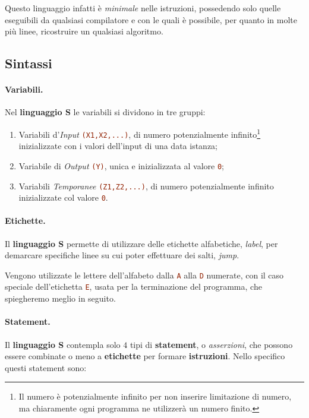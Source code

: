 Questo linguaggio infatti è \textit{minimale} nelle istruzioni, possedendo solo quelle eseguibili da qualsiasi compilatore e con le quali è possibile, per quanto in molte più linee, ricostruire un qualsiasi algoritmo.

\subsection{Sintassi}

\paragraph*{Variabili.} Nel \textbf{linguaggio S} le variabili si dividono in tre gruppi:

\begin{enumerate}
  \item Variabili d'\textit{Input} \lstinline[language=ini]{(X1,X2,...)}, di numero potenzialmente infinito\footnote{Il numero è potenzialmente infinito per non inserire limitazione di numero, ma chiaramente ogni programma ne utilizzerà un numero finito.} inizializzate con i valori dell'input di una data istanza;
  \item Variabile di \textit{Output} \lstinline[language=ini]{(Y)}, unica e inizializzata al valore \lstinline[language=ini]{0};
  \item Variabili \textit{Temporanee} \lstinline[language=ini]{(Z1,Z2,...)}, di numero potenzialmente infinito inizializzate col valore \lstinline[language=ini]{0}.
\end{enumerate}

\paragraph*{Etichette.} Il \textbf{linguaggio S} permette di utilizzare delle
etichette alfabetiche, \textit{label}, per demarcare specifiche linee su cui
poter effettuare dei salti, \textit{jump}.


Vengono utilizzate le lettere dell'alfabeto dalla \lstinline[language=ini]{A} alla \lstinline[language=ini]{D} numerate, con il caso
speciale dell'etichetta \lstinline[language=ini]{E}, usata per la terminazione del programma, che spiegheremo meglio in seguito.

\paragraph*{Statement.} Il \textbf{linguaggio S} contempla solo \(4\) tipi di \textbf{statement}, o \textit{asserzioni}, che possono essere combinate o meno a \textbf{etichette} per formare
\textbf{istruzioni}.
Nello specifico questi statement sono:

